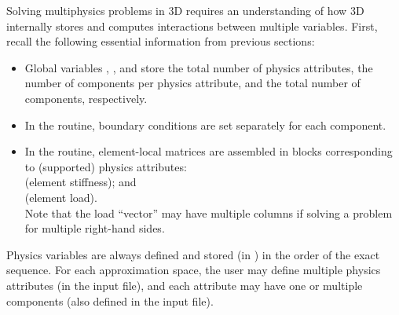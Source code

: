 Solving multiphysics problems in \hp3D requires an understanding of how \hp3D internally stores and computes interactions between multiple variables.
First, recall the following essential information from previous sections:
\begin{itemize}
	\item Global variables , , and  store the total number of physics attributes, the number of components per physics attribute, and the total number of components, respectively.
	\item In the  routine, boundary conditions are set separately for each component.
	\item In the  routine, element-local matrices are assembled in blocks corresponding to (supported) physics attributes:\\ 
	 (element stiffness); and \\
	 (element load).\\
	Note that the load ``vector'' may have multiple columns if solving a problem for multiple right-hand sides.
\end{itemize}

Physics variables are always defined and stored (in ) in the order of the exact sequence. For each approximation space, the user may define multiple physics attributes (in the  input file), and each attribute may have one or multiple components (also defined in the  input file).

